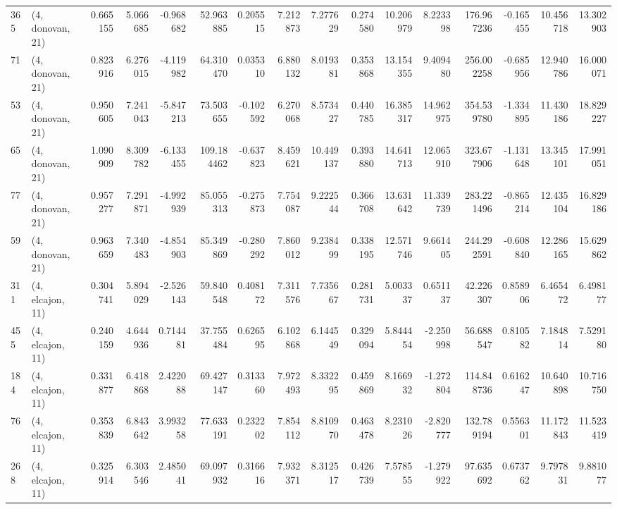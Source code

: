 \begin{tabular}{llrrrrrrrrrrrrrr}
365 &  (4, donovan, 21) &   0.665155 &   5.066685 &  -0.968682 &    52.963885 &   0.205515 &   7.212873 &   7.277629 &  0.274580 &  10.206979 &   8.223398 &   176.967236 & -0.165455 &  10.456718 &  13.302903 \\
71  &  (4, donovan, 21) &   0.823916 &   6.276015 &  -4.119982 &    64.310470 &   0.035310 &   6.880132 &   8.019381 &  0.353868 &  13.154355 &   9.409480 &   256.002258 & -0.685956 &  12.940786 &  16.000071 \\
53  &  (4, donovan, 21) &   0.950605 &   7.241043 &  -5.847213 &    73.503655 &  -0.102592 &   6.270068 &   8.573427 &  0.440785 &  16.385317 &  14.962975 &   354.539780 & -1.334895 &  11.430186 &  18.829227 \\
65  &  (4, donovan, 21) &   1.090909 &   8.309782 &  -6.133455 &   109.184462 &  -0.637823 &   8.459621 &  10.449137 &  0.393880 &  14.641713 &  12.065910 &   323.677906 & -1.131648 &  13.345101 &  17.991051 \\
77  &  (4, donovan, 21) &   0.957277 &   7.291871 &  -4.992939 &    85.055313 &  -0.275873 &   7.754087 &   9.222544 &  0.366708 &  13.631642 &  11.339739 &   283.221496 & -0.865214 &  12.435104 &  16.829186 \\
59  &  (4, donovan, 21) &   0.963659 &   7.340483 &  -4.854903 &    85.349869 &  -0.280292 &   7.860012 &   9.238499 &  0.338195 &  12.571746 &   9.661405 &   244.292591 & -0.608840 &  12.286165 &  15.629862 \\
311 &  (4, elcajon, 11) &   0.304741 &   5.894029 &  -2.526143 &    59.840548 &   0.408172 &   7.311576 &   7.735667 &  0.281731 &   5.003337 &   0.651137 &    42.226307 &  0.858906 &   6.465472 &   6.498177 \\
455 &  (4, elcajon, 11) &   0.240159 &   4.644936 &   0.714481 &    37.755484 &   0.626595 &   6.102868 &   6.144549 &  0.329094 &   5.844454 &  -2.250998 &    56.688547 &  0.810582 &   7.184814 &   7.529180 \\
184 &  (4, elcajon, 11) &   0.331877 &   6.418868 &   2.422088 &    69.427147 &   0.313360 &   7.972493 &   8.332295 &  0.459869 &   8.166932 &  -1.272804 &   114.848736 &  0.616247 &  10.640898 &  10.716750 \\
76  &  (4, elcajon, 11) &   0.353839 &   6.843642 &   3.993258 &    77.633191 &   0.232202 &   7.854112 &   8.810970 &  0.463478 &   8.231026 &  -2.820777 &   132.789194 &  0.556301 &  11.172843 &  11.523419 \\
268 &  (4, elcajon, 11) &   0.325914 &   6.303546 &   2.485041 &    69.097932 &   0.316616 &   7.932371 &   8.312517 &  0.426739 &   7.578555 &  -1.279922 &    97.635692 &  0.673762 &   9.797831 &   9.881077 \\

\end{tabular}
